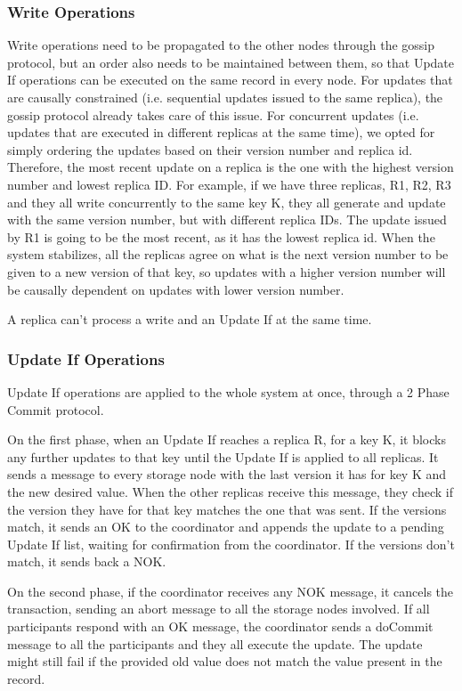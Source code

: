 \documentclass[times, 10pt,twocolumn]{article}
\begin{document}
\subsubsection{Write Operations}    
Write operations need to be propagated to the other nodes through the gossip protocol, but an order also needs to be maintained between them, so that Update If operations
can be executed on the same record in every node. For updates that are causally constrained (i.e. sequential updates issued to the same replica), the gossip protocol already takes care of this issue. 
For concurrent updates (i.e. updates that are executed in different replicas at the same time), we opted for simply ordering the updates based on their version number and replica id. Therefore, the most recent update
on a replica is the one with the highest version number and lowest replica ID. For example, if we have three replicas, R1, R2, R3 and they all write concurrently to the same key K, they all generate and update with the
same version number, but with different replica IDs. The update issued by R1 is going to be the most recent, as it has the lowest replica id. When the system stabilizes, all the replicas agree on what is the next version 
number to be given to a new version of that key, so updates with a higher version number will be causally dependent on updates with lower version number.

A replica can't process a write and an Update If at the same time.

\subsubsection{Update If Operations}

Update If operations are applied to the whole system at once, through a 2 Phase Commit protocol. 

On the first phase, when an Update If reaches a replica R, for a key K, it blocks any further updates to that key until the Update If is applied to all replicas. It sends a message to 
every storage node with the last version it has for key K and the new desired value. When the other replicas receive this message, they check if the version they have for that key 
matches the one that was sent. If the versions match, it sends an OK to the coordinator and appends the update to a pending Update If list, waiting for confirmation from the coordinator.
If the versions don't match, it sends back a NOK.

On the second phase, if the coordinator receives any NOK message, it cancels the transaction, sending an abort message to all the storage nodes involved.
If all participants respond with an OK message, the coordinator sends a doCommit message to all the participants and they all execute the update. The update might still fail if the provided old value
does not match the value present in the record.
\end{document}
